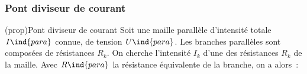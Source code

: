 \documentclass[../../main/main.tex]{subfiles}
\begin{document}
\subsubsection{Pont diviseur de courant}

\begin{tcb*}[label=prop:divcour, sidebyside, righthand ratio=.3](prop){Pont diviseur de courant}
	Soit une maille parallèle d'intensité totale $I\ind{para}$ connue, de tension
	$U\ind{para}$. Les branches parallèles sont composées de
	résistances $R_k$. On cherche l'intensité $I_k$ d'une des résistances $R_k$ de
	la maille. Avec $R\ind{para}$ la résistance équivalente de la branche, on a alors~:
	\psw{%
		\[
			\boxed{I_k = \frac{R\ind{para}}{R_k}I\ind{para}}
			\Lra
			\boxed{I_k = \frac{G_k}{G\ind{para}}I\ind{para}}
		\]
	}%
	\vspace{-15pt}
	\tcblower
	\begin{center}
	\end{center}
\end{tcb*}
\end{document}
